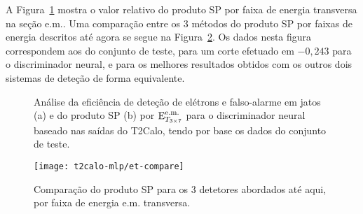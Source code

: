 

A Figura~\ref{fig:best-t2calo-test-efficiency-et} mostra o valor relativo do
produto SP por faixa de energia transversa na seção e.m.. Uma comparação entre
os 3 métodos do produto SP por faixas de energia descritos até agora se segue
na Figura~\ref{fig:best-t2calo-versus-others-emet}. Os dados nesta figura
correspondem aos do conjunto de teste, para um corte efetuado em $-0,243$ para
o discriminador neural, e para os melhores resultados obtidos com os outros
dois sistemas de deteção de forma equivalente.

\begin{figure}
\begin{center}
\end{center}
\caption{Análise da eficiência de deteção de elétrons e falso-alarme em jatos
(a) e do produto SP (b) por $\text{E}^{\text{e.m.}}_{T_{3\times7}}$ para o discriminador neural baseado nas
saídas do T2Calo, tendo por base os dados do conjunto de teste.}
\label{fig:best-t2calo-test-efficiency-et}
\end{figure}

\begin{figure}
\begin{center}
\texttt{[image: t2calo-mlp/et-compare]}
\end{center}
\caption{Comparação do produto SP para os 3 detetores abordados até aqui, por
faixa de energia e.m. transversa.}
\label{fig:best-t2calo-versus-others-emet}
\end{figure}

